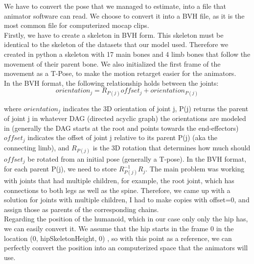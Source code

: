 
We have to convert the pose that we managed to estimate, into a file that animator software can read. We choose to convert it into a BVH file, as it is the most common file for computerized mocap clips. \\

Firstly, we have to create a skeleton in BVH form. This skeleton must be identical to the skeleton of the datasets that our model used. Therefore we created in python a skeleton with 17 main bones and 4 limb bones that follow the movement of their parent bone. We also initialized the first frame of the movement as a T-Pose, to make the motion retarget easier for the animators.\\

In the BVH format, the following relationship holds between the joints:
$$orientation_j=R_{P(j)}offset_j + orientation_{P(j)}$$

where $orientation_j$ indicates the 3D orientation of joint j, P(j) returns the parent of joint j in whatever DAG (directed acyclic graph) the orientations are modeled in (generally the DAG starts at the root and points towards the end-effectors) $offset_j$ indicates the offset of joint j relative to its parent P(j) (aka the connecting limb), and $R_{P(j)}$ is the 3D rotation that determines how much should $offset_j$ be rotated from an initial pose (generally a T-pose). In the BVH format, for each parent P(j), we need to store $R^{-1}_{P(j)}R_j$. The main problem was working with joints that had multiple children, for example, the root joint, which has connections to both legs as well as the spine. Therefore, we came up with a solution for joints with multiple children, I had to make copies with offset=0, and assign those as parents of the corresponding chains. \\

Regarding the position of the humanoid, which in our case only only the hip has, we can easily convert it. We assume that the hip starts in the frame 0 in the location (0, hipSkeletonHeight, 0) , so with this point as a reference, we can perfectly convert the position into an computerized space that the animators will use.\\

